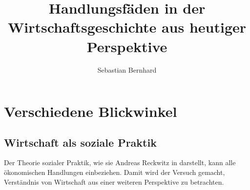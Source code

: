 \documentclass[a4paper]{book}
\begin{document}
\author{Sebastian Bernhard}
\title{Handlungsfäden in der Wirtschaftsgeschichte aus heutiger Perspektive}
\maketitle
\tableofcontents

\part{Verschiedene Blickwinkel}

\chapter{Wirtschaft als soziale Praktik}

Der Theorie sozialer Praktik, wie sie Andreas Reckwitz in
\cite{reckwitz2003praktiken} darstellt, kann alle ökonomischen 
Handlungen einbeziehen. Damit wird der Versuch gemacht,
Verständnis von Wirtschaft aus einer weiteren Perspektive
zu betrachten.





















 
\end{document}
